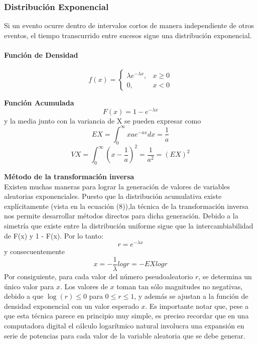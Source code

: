 \documentclass[11pt]{article}
\begin{document}
\newpage

\subsubsection{Distribución Exponencial}

Si un evento ocurre dentro de intervalos cortos de manera independiente de otros eventos, el tiempo transcurrido entre sucesos sigue una distribución exponencial.
\paragraph*{Función de Densidad\newline}
\[
f(x) = 
\begin{cases}
\lambda e^{-\lambda x}, & x \geq 0 \\
0, & x < 0
\end{cases}
\]

\noindent\textbf{Función Acumulada}\\
\[
F(x) = 1 - e^{-\lambda x}
\]
y la media junto con la variancia de X se pueden expresar como
  \begin{equation}
    EX = \int_{0}^{\infty} xae^{-ax}dx = \frac{1}{a}
  \end{equation}
  \begin{equation}
  VX = \int_{0}^{\infty} (x-\frac{1}{a})^2 = \frac{1}{a^2} = (EX)^2
\end{equation}
  
\noindent\textbf{Método de la transformación inversa}\\

Existen muchas maneras para lograr la generación de valores de variables aleatorias exponenciales. Puesto que la distribución acumulativa existe explícitamente (vista en la ecuación (8)),la técnica de la transformación inversa nos permite desarrollar métodos directos para dicha generación.
Debido a la simetría que existe entre la distribución uniforme sigue que la intercambiabilidad de F(x) y 1 - F(x). Por lo tanto:
\begin{equation}
r = e^{-\lambda x}
\end{equation}
y consecuentemente
\begin{equation}
x = -\frac{1}{\lambda}log r  = - EXlog r
\end{equation}
Por consiguiente, para cada valor del número pseudoaleatorio \( r \), se determina un único valor para \( x \). Los valores de \( x \) toman tan sólo magnitudes no negativas, debido a que \( \log(r) \leq 0 \) para \( 0 \leq r \leq 1 \), y además se ajustan a la función de densidad exponencial con un valor esperado \( x \). Es importante notar que, pese a que esta técnica parece en principio muy simple, es preciso recordar que en una computadora digital el cálculo logarítmico natural involucra una expansión en serie de potencias para cada valor de la variable aleatoria que se debe generar.
\end{document}
